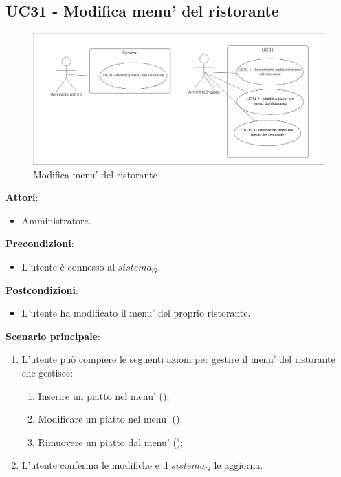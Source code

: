 \subsection{UC31 - Modifica menu' del ristorante}\label{usecase:31}
\begin{figure}[H]
    \centering
    \includegraphics[width=0.9\linewidth]{ucd/UCD31.png}
    \caption{Modifica menu' del ristorante}
\end{figure}
\textbf{Attori}:
\begin{itemize}
    \item Amministratore.
\end{itemize}
\textbf{Precondizioni}:
\begin{itemize}
    \item L'utente è connesso al $\textit{sistema}_G$.
\end{itemize}
\textbf{Postcondizioni}:
\begin{itemize}
    \item L'utente ha modificato il menu' del proprio ristorante.
\end{itemize}
\textbf{Scenario principale}:
\begin{enumerate}
    \item L'utente può compiere le seguenti azioni per gestire il menu' del ristorante che gestisce:
    \begin{enumerate}
        \item Inserire un piatto nel menu' ();
        \item Modificare un piatto nel menu' ();
        \item Rimuovere un piatto dal menu' ();
    \end{enumerate}
    \item L'utente conferma le modifiche e il $\textit{sistema}_G$ le aggiorna.
\end{enumerate}